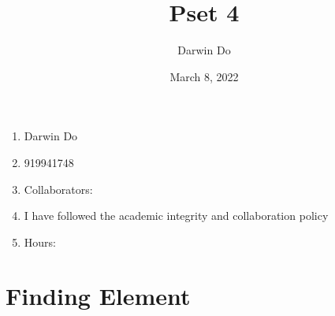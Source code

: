 \documentclass{article}
\title{Pset 4}
\begin{document}
\newcommand{\Not}{\textbf{not}}
\newcommand{\AAnd}{\textbf{and}}
\newcommand{\True}{\texttt{True}}
\newcommand{\False}{\texttt{False}}

\date{March 8, 2022 }
\author{Darwin Do}

\maketitle

\begin{enumerate}
    \item Darwin Do
    \item 919941748
    \item Collaborators: 
    \item I have followed the academic integrity and collaboration policy
    \item Hours: 
\end{enumerate}

\newpage

\section{Finding Element}
\end{document}
